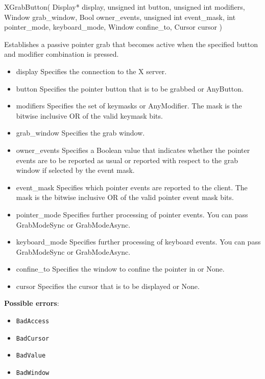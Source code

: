 \documentclass{report}
\begin{document}
\begin{itemize}
        \begin{cppcode}
        XGrabButton(
            Display* display,
            unsigned int button,
            unsigned int modifiers,
            Window grab_window,
            Bool owner_events,
            unsigned int event_mask,
            int pointer_mode, keyboard_mode,
            Window confine_to,
            Cursor cursor
        )
        \end{cppcode}
        \bigbreak \noindent
        Establishes a passive pointer grab that becomes active when the specified button and modifier combination is pressed.
        \begin{itemize}
            \item display Specifies the connection to the X server.
            \item button Specifies the pointer button that is to be grabbed or AnyButton.
            \item modifiers Specifies the set of keymasks or AnyModifier. The mask is the bitwise inclusive OR of the valid keymask bits.
            \item grab\_window Specifies the grab window.
            \item owner\_events Specifies a Boolean value that indicates whether the pointer events are to be reported as usual or reported with respect to the grab window if selected by the event mask.
            \item event\_mask Specifies which pointer events are reported to the client. The mask is the bitwise inclusive OR of the valid pointer event mask bits.
            \item pointer\_mode Specifies further processing of pointer events. You can pass GrabModeSync or GrabModeAsync.
            \item keyboard\_mode Specifies further processing of keyboard events. You can pass GrabModeSync or GrabModeAsync.
            \item confine\_to Specifies the window to confine the pointer in or None.
            \item cursor Specifies the cursor that is to be displayed or None.
        \end{itemize}
        \textbf{Possible errors}:
        \begin{itemize}
            \item \texttt{BadAccess}
            \item \texttt{BadCursor}
            \item \texttt{BadValue}
            \item \texttt{BadWindow}
        \end{itemize}


\end{itemize}
\end{document}
